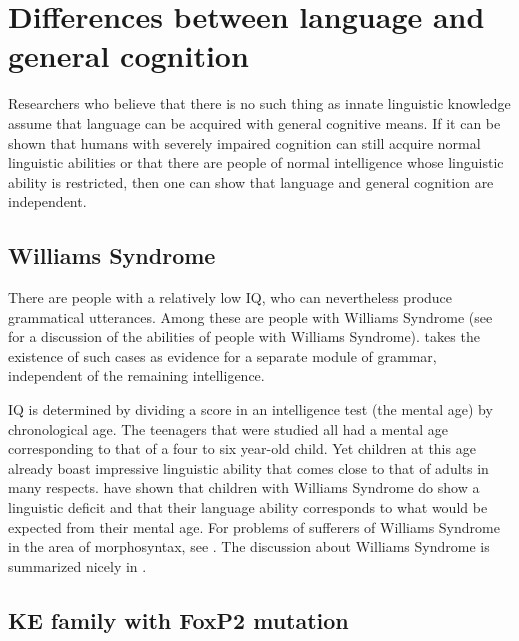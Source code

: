 \section{Differences between language and general cognition}

Researchers who believe that there is no such thing as innate linguistic knowledge assume that language can be acquired with general cognitive
means. If it can be shown that humans with severely impaired cognition can still acquire normal linguistic abilities or that there are people
of normal intelligence whose linguistic ability is restricted, then one can show that language and general cognition are independent.

\subsection{Williams Syndrome}

There are people with a relatively low IQ, who can nevertheless produce grammatical utterances.
Among these are people with Williams Syndrome (see  for a discussion of the abilities of people with
Williams Syndrome). \citet{Yamada81a} takes the existence of such cases as evidence for a separate module of grammar, independent
of the remaining intelligence.

IQ is determined by dividing a score in an intelligence test (the mental age) by chronological age. The teenagers that were studied
all had a mental age corresponding to that of a four to six year-old child. Yet children at this age already boast impressive
linguistic ability that comes close to that of adults in many respects. \citet*[]{GSP94a} have shown that children
with Williams Syndrome do show a linguistic deficit and that their language ability corresponds to what would be expected
from their mental age. For problems of sufferers of Williams Syndrome in the area of morphosyntax, see .
The discussion about Williams Syndrome is summarized nicely in .

\subsection{KE family with FoxP2 mutation}

